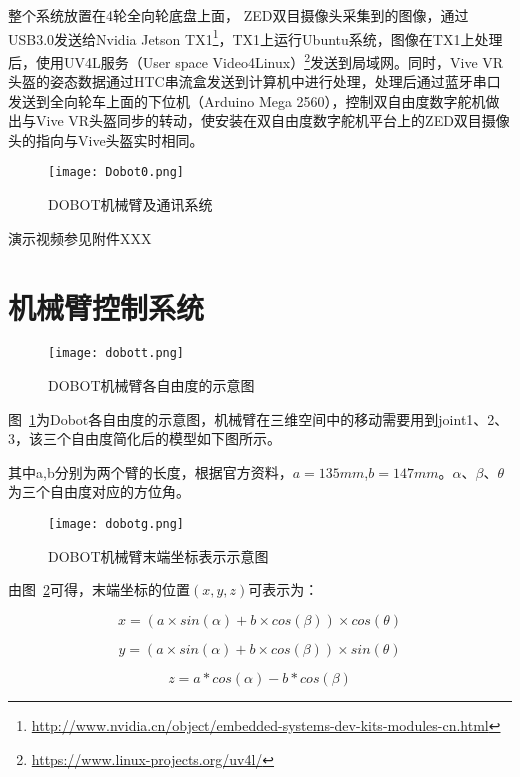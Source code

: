 整个系统放置在4轮全向轮底盘上面， ZED双目摄像头采集到的图像，通过USB3.0发送给Nvidia Jetson TX1\footnote{\url{http://www.nvidia.cn/object/embedded-systems-dev-kits-modules-cn.html}}，TX1上运行Ubuntu系统，图像在TX1上处理后，使用UV4L服务（User space Video4Linux）\footnote{\url{https://www.linux-projects.org/uv4l/}}发送到局域网。同时，Vive VR头盔的姿态数据通过HTC串流盒发送到计算机中进行处理，处理后通过蓝牙串口发送到全向轮车上面的下位机（Arduino Mega 2560），控制双自由度数字舵机做出与Vive VR头盔同步的转动，使安装在双自由度数字舵机平台上的ZED双目摄像头的指向与Vive头盔实时相同。

\begin{figure}[htbp]
\small
\centering
\texttt{[image: Dobot0.png]}
\caption{DOBOT机械臂及通讯系统} 
\end{figure}


演示视频参见附件XXX


\section{机械臂控制系统}

\begin{figure}[htbp]
\small
\centering
\texttt{[image: dobott.png]}
\caption{DOBOT机械臂各自由度的示意图} 
\label{dobott}
\end{figure}

图~\ref{dobott}为Dobot各自由度的示意图，机械臂在三维空间中的移动需要用到joint1、2、3，该三个自由度简化后的模型如下图所示。

其中a,b分别为两个臂的长度，根据官方资料，$a=135mm$,$b=147mm$。$\alpha$、$\beta$、$\theta$ 为三个自由度对应的方位角。

\begin{figure}[htbp]
\small
\centering
\texttt{[image: dobotg.png]}
\caption{DOBOT机械臂末端坐标表示示意图} 
\label{dobotg}
\end{figure}

由图~\ref{dobotg}可得，末端坐标的位置$(x,y,z)$可表示为：

\begin{equation}
x=(a \times sin(\alpha)+b \times cos(\beta)) \times cos(\theta)
\end{equation}

\begin{equation}
y=(a \times sin(\alpha)+b \times cos(\beta)) \times sin(\theta)
\end{equation}

\begin{equation}
z=a*cos(\alpha)-b*cos(\beta)
\end{equation}

